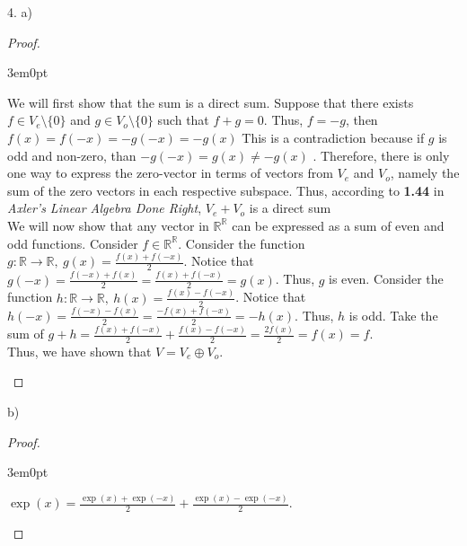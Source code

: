 \documentclass[11pt]{article}
\newcommand{\bproof}{\begin{proof}
$ $ \\
\begin{adjustwidth}{3em}{0pt}
}
\newcommand{\eproof}{\end{adjustwidth}
\end{proof}}
\begin{document}
\begin{flushleft}
\newpage

4. a)

\bproof

We will first show that the sum is a direct sum. Suppose that there exists $f \in V_e \setminus \{0\}$ and $g \in V_o \setminus \{0\}$ such that $f + g = 0$. Thus, $f = -g$, then $f(x) = f(-x) = -g(-x) = -g(x)$ This is a contradiction because if $g$ is odd and non-zero, than $-g(-x) = g(x) \neq -g(x)$ . Therefore, there is only one way to express the zero-vector in terms of vectors from $V_e$ and $V_o$, namely the sum of the zero vectors in each respective subspace. Thus, according to \textbf{1.44} in \textit{Axler's Linear Algebra Done Right}, $V_e + V_o$ is a direct sum \\
\bigskip
We will now show that any vector in $\mathbb{R}^{\mathbb{R}}$ can be expressed as a sum of even and odd functions. Consider $f \in \mathbb{R}^{\mathbb{R}}$. Consider the function $g: \mathbb{R} \rightarrow \mathbb{R}, \ g(x) = \frac{f(x) + f(-x)}{2}$. Notice that $g(-x) = \frac{f(-x)+f(x)}{2} = \frac{f(x)+f(-x)}{2} = g(x)$. Thus, $g$ is even. Consider the function $h: \mathbb{R} \rightarrow \mathbb{R}, \ h(x) = \frac{f(x) - f(-x)}{2}$. Notice that $h(-x) = \frac{f(-x)-f(x)}{2} = \frac{-f(x) + f(-x)}{2} = -h(x)$. Thus, $h$ is odd. Take the sum of $g + h = \frac{f(x)+f(-x)}{2} + \frac{f(x)-f(-x)}{2} = \frac{2f(x)}{2} = f(x) = f$.\\
\bigskip
Thus, we have shown that $V = V_e \oplus V_o$.

\eproof

b)

\bproof

$\exp(x) = \frac{\exp(x)+\exp(-x)}{2} + \frac{\exp(x)-\exp(-x)}{2}$. 

\eproof


\end{flushleft}
\end{document}
